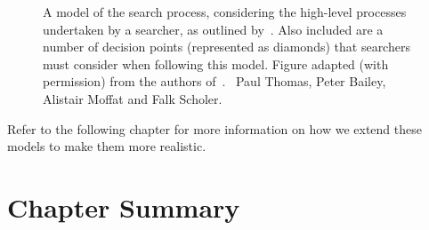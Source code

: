 \begin{figure}[t!]
    \centering
    \caption[Model of the search process by~\cite{thomas2014modelling_behaviour}]{A model of the search process, considering the high-level processes undertaken by a searcher, as outlined by~\cite{thomas2014modelling_behaviour}. Also included are a number of decision points (represented as diamonds) that searchers must consider when following this model. Figure adapted (with permission) from the authors of~\citealt{thomas2014modelling_behaviour}. \textcopyright~Paul Thomas, Peter Bailey, Alistair Moffat and Falk Scholer.}
    \label{fig:thomas_model}
\end{figure}


Refer to the following chapter for more information on how we extend these models to make them more realistic.

\section{Chapter Summary}